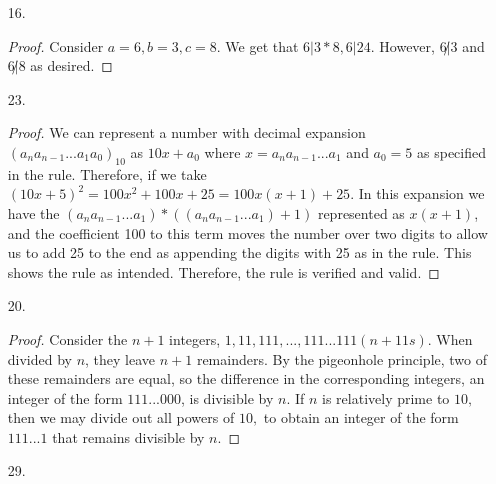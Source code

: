 \documentclass[11pt]{article}
\theoremstyle{definition}
\begin{document}
\begin{enumerate}
    \newpage
    \item [16. ]
    
    \begin{proof}
    Consider $a = 6, b = 3, c = 8.$ We get that $6|3*8, 6|24.$ However, $6\not|3$ and $6\not|8$ as desired.
    \end{proof}
    
    \newpage
    \item [23. ]
    
    \begin{proof}
    We can represent a number with decimal expansion $(a_na_{n-1}...a_1a_0)_10$ as $10x + a_0$ where $x = a_na_{n-1}...a_1$ and $a_0=5$ as specified in the rule. Therefore, if we take $(10x+5)^2 = 100x^2 + 100x + 25 = 100x(x+1)+25$. In this expansion we have the $(a_na_{n-1}...a_1)*((a_na_{n-1}...a_1)+1)$ represented as $x(x+1)$, and the coefficient 100 to this term moves the number over two digits to allow us to add 25 to the end as appending the digits with 25 as in the rule. This shows the rule as intended. Therefore, the rule is verified and valid. 
    \end{proof}
    
    \newpage
    \item [20. ]
    
    \begin{proof}
    Consider the $n+1$ integers, $1, 11, 111, ..., 111...111 (n+1 1s).$ When divided by $n$, they leave $n+1$ remainders. By the pigeonhole principle, two of these remainders are equal, so the difference in the corresponding integers, an integer of the form $111...000$, is divisible by $n.$ If $n$ is relatively prime to $10,$ then we may divide out all powers of $10,$ to obtain an integer of the form $111...1$ that remains divisible by $n.$
    \end{proof}
    
    \newpage
    \item [29. ]
    

\end{enumerate}
\end{document}
